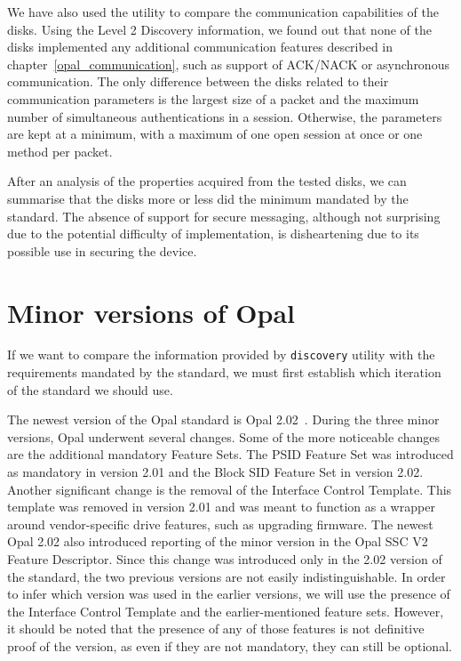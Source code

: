 We have also used the utility to compare the communication capabilities of the disks.
Using the Level 2 Discovery information, we found out that none of the disks implemented any additional communication features described in chapter~\ref{opal_communication}, such as support of ACK/NACK or asynchronous communication. The only difference between the disks related to their communication parameters is the largest size of a packet and the maximum number of simultaneous authentications in a session.
Otherwise, the parameters are kept at a minimum, with a maximum of one open session at once or one method per packet.

After an analysis of the properties acquired from the tested disks, we can summarise that the disks more or less did the minimum mandated by the standard. 
The absence of support for secure messaging, although not surprising due to the potential difficulty of implementation, is disheartening due to its possible use in securing the device.



\section{Minor versions of Opal}

If we want to compare the information provided by \verb|discovery| utility with the requirements mandated by the standard, we must first establish which iteration of the standard we should use.

The newest version of the Opal standard is Opal 2.02~\cite{tcg-opal2}. During the three minor versions, Opal underwent several changes. 
Some of the more noticeable changes are the additional mandatory Feature Sets. The PSID Feature Set was introduced as mandatory in version 2.01 and the Block SID Feature Set in version 2.02. Another significant change is the removal of the Interface Control Template. This template was removed in version 2.01 and was meant to function as a wrapper around vendor-specific drive features, such as upgrading firmware.
The newest Opal 2.02 also introduced reporting of the minor version in the Opal SSC V2 Feature Descriptor. Since this change was introduced only in the 2.02 version of the standard, the two previous versions are not easily indistinguishable. In order to infer which version was used in the earlier versions, we will use the presence of the Interface Control Template and the earlier-mentioned feature sets. However, it should be noted that the presence of any of those features is not definitive proof of the version, as even if they are not mandatory, they can still be optional.


